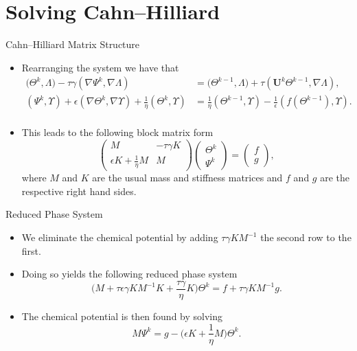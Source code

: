 \documentclass[9pt]{beamer}
\newcommand{\grad}{\nabla}
\newcommand{\eps}{\epsilon}
\begin{document}
\section{Solving Cahn--Hilliard}
\begin{frame}{Cahn--Hilliard Matrix Structure}
	\begin{itemize}
		\item Rearranging the system we have that
		\begin{align*}
			\bigg(\Theta^k, \Lambda\bigg) - \tau\gamma(\grad \Psi^k, \grad \Lambda)&=\bigg(\Theta^{k-1}, \Lambda\bigg) + \tau(\mathbf{U}^k\Theta^{k-1}, \grad\Lambda),\\
			(\Psi^k, \Upsilon) + \eps(\grad \Theta^k, \grad \Upsilon) + \frac{1}{\eta}(\Theta^k, \Upsilon) &= \frac{1}{\eta}(\Theta^{k-1}, \Upsilon)-\frac{1}{\eps}(f(\Theta^{k-1}), \Upsilon).\\
		\end{align*}
		
		\item This leads to the following block matrix form
		$$\begin{pmatrix}
			M & -\tau\gamma K \\
			\eps K + \frac{1}{\eta}M & M
		\end{pmatrix}
		\begin{pmatrix}
			\Theta^k\\
			\Psi^k
		\end{pmatrix} = 
		\begin{pmatrix}
			f\\
			g
		\end{pmatrix},
		$$
		where $M$ and $K$ are the usual mass and stiffness matrices and $f$ and $g$ are the respective right hand sides.
	\end{itemize}
\end{frame}

\begin{frame}{Reduced Phase System}
	\begin{itemize}
		\item We eliminate the chemical potential by adding $\tau\gamma KM^{-1}$ the second row to the first. 
		\vspace{.1in}
		\item Doing so yields the following reduced phase system
		$$
			\bigg(M + \tau\eps\gamma KM^{-1}K + \frac{\tau \gamma}{\eta}K\bigg)\Theta^k = f + \tau \gamma KM^{-1}g.
		$$
		\vspace{.1in}
		\item The chemical potential is then found by solving
		$$
			M \Psi^k = g - \bigg(\eps K + \frac{1}{\eta}M\bigg)\Theta^k.
		$$
	\end{itemize}
\end{frame}
\end{document}
